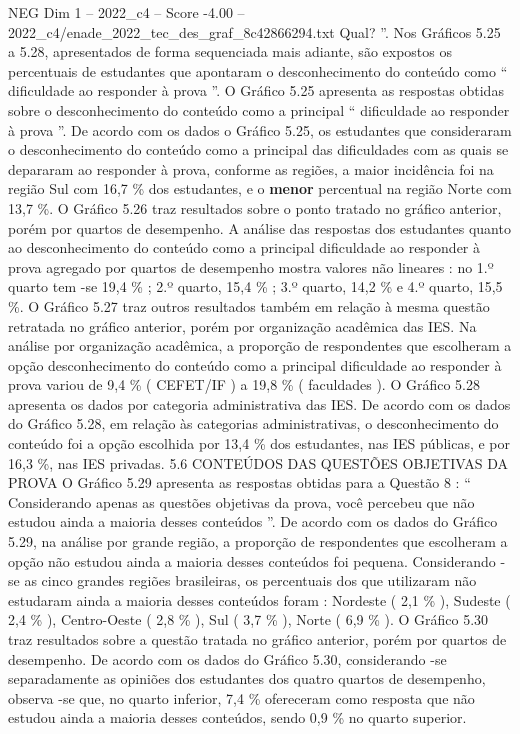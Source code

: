 \begin{textsample}{NEG Dim 1 – 2022\_c4 – Score -4.00 – 2022\_c4/enade\_2022\_tec\_des\_graf\_8c42866294.txt}
Qual? ”.
Nos Gráficos 5.25 a 5.28, apresentados de forma sequenciada mais adiante, são expostos os percentuais de estudantes que apontaram o desconhecimento do conteúdo como “ dificuldade ao responder à prova ”.
O Gráfico 5.25 apresenta as respostas obtidas sobre o desconhecimento do conteúdo como a principal “ dificuldade ao responder à prova ”.
De acordo com os dados o Gráfico 5.25, os estudantes que consideraram o desconhecimento do conteúdo como a principal das dificuldades com as quais se depararam ao responder à prova, conforme as regiões, a maior incidência foi na região Sul com 16,7 \% dos estudantes, e o \textbf{menor} percentual na região Norte com 13,7 \%.
O Gráfico 5.26 traz resultados sobre o ponto tratado no gráfico anterior, porém por quartos de desempenho.
A análise das respostas dos estudantes quanto ao desconhecimento do conteúdo como a principal dificuldade ao responder à prova agregado por quartos de desempenho mostra valores não lineares : no 1.º quarto tem -se 19,4 \% ; 2.º quarto, 15,4 \% ; 3.º quarto, 14,2 \% e 4.º quarto, 15,5 \%.
O Gráfico 5.27 traz outros resultados também em relação à mesma questão retratada no gráfico anterior, porém por organização acadêmica das IES.
Na análise por organização acadêmica, a proporção de respondentes que escolheram a opção desconhecimento do conteúdo como a principal dificuldade ao responder à prova variou de 9,4 \% ( CEFET/IF ) a 19,8 \% ( faculdades ).
O Gráfico 5.28 apresenta os dados por categoria administrativa das IES.
De acordo com os dados do Gráfico 5.28, em relação às categorias administrativas, o desconhecimento do conteúdo foi a opção escolhida por 13,4 \% dos estudantes, nas IES públicas, e por 16,3 \%, nas IES privadas. 5.6 CONTEÚDOS DAS QUESTÕES OBJETIVAS DA PROVA O Gráfico 5.29 apresenta as respostas obtidas para a Questão 8 : “ Considerando apenas as questões objetivas da prova, você percebeu que não estudou ainda a maioria desses conteúdos ”.
De acordo com os dados do Gráfico 5.29, na análise por grande região, a proporção de respondentes que escolheram a opção não estudou ainda a maioria desses conteúdos foi pequena.
Considerando -se as cinco grandes regiões brasileiras, os percentuais dos que utilizaram não estudaram ainda a maioria desses conteúdos foram : Nordeste ( 2,1 \% ), Sudeste ( 2,4 \% ), Centro-Oeste ( 2,8 \% ), Sul ( 3,7 \% ), Norte ( 6,9 \% ).
O Gráfico 5.30 traz resultados sobre a questão tratada no gráfico anterior, porém por quartos de desempenho.
De acordo com os dados do Gráfico 5.30, considerando -se separadamente as opiniões dos estudantes dos quatro quartos de desempenho, observa -se que, no quarto inferior, 7,4 \% ofereceram como resposta que não estudou ainda a maioria desses conteúdos, sendo 0,9 \% no quarto superior.

\end{textsample}
